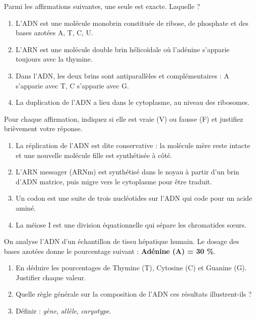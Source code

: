 \documentclass[11pt]{article}
\newcounter{popsec}
\newcounter{popsub}
\newcommand{\courssub}[1]{%
  \stepcounter{popsub}%
  \par\vspace{9pt}\noindent{\popxbold\fontsize{11.5}{13}\selectfont\color{popink}{\color{poporange}\thepopsec.\thepopsub}\hspace{6pt}#1}\par\nopagebreak\vspace{4pt}
}
\begin{document}
\courssub{Je vérifie mes connaissances}

\begin{exercice}
Parmi les affirmations suivantes, une seule est exacte. Laquelle ?
\begin{enumerate}
    \item L'ADN est une molécule monobrin constituée de ribose, de phosphate et des bases azotées A, T, C, U.
    \item L'ARN est une molécule double brin hélicoïdale où l'adénine s'apparie toujours avec la thymine.
    \item Dans l'ADN, les deux brins sont antiparallèles et complémentaires : A s'apparie avec T, C s'apparie avec G.
    \item La duplication de l'ADN a lieu dans le cytoplasme, au niveau des ribosomes.
\end{enumerate}
\end{exercice}

\begin{exercice}
Pour chaque affirmation, indiquez si elle est vraie (V) ou fausse (F) et justifiez brièvement votre réponse.
\begin{enumerate}
    \item La réplication de l'ADN est dite conservative : la molécule mère reste intacte et une nouvelle molécule fille est synthétisée à côté.
    \item L'ARN messager (ARNm) est synthétisé dans le noyau à partir d'un brin d'ADN matrice, puis migre vers le cytoplasme pour être traduit.
    \item Un codon est une suite de trois nucléotides sur l'ADN qui code pour un acide aminé.
    \item La méiose I est une division équationnelle qui sépare les chromatides sœurs.
\end{enumerate}
\end{exercice}

\begin{exercice}
On analyse l'ADN d'un échantillon de tissu hépatique humain. Le dosage des bases azotées donne le pourcentage suivant : \textbf{Adénine (A) = 30 \%}.
\begin{enumerate}
    \item En déduire les pourcentages de Thymine (T), Cytosine (C) et Guanine (G). Justifier chaque valeur.
    \item Quelle règle générale sur la composition de l'ADN ces résultats illustrent-ils ?
    \item Définir : \emph{gène}, \emph{allèle}, \emph{caryotype}.
\end{enumerate}
\end{exercice}
\end{document}
